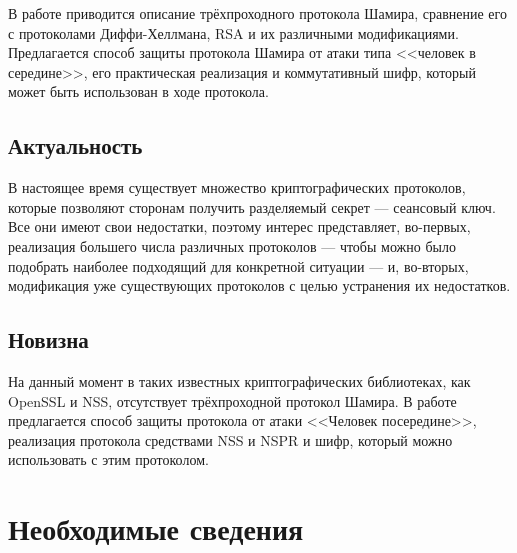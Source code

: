 



\usepackage{csquotes}        %
\usepackage[
]{biblatex}





\Intro

В работе приводится описание трёхпроходного протокола Шамира, сравнение его с протоколами Диффи-Хеллмана, RSA и их различными модификациями. Предлагается способ защиты протокола Шамира от атаки типа <<человек в середине>>, его практическая реализация и коммутативный шифр, который может быть использован в ходе протокола. 
\subsection*{Актуальность}
В настоящее время существует множество криптографических протоколов, которые позволяют сторонам получить разделяемый секрет --- сеансовый ключ. Все они имеют свои недостатки, поэтому интерес представляет, во-первых, реализация большего числа различных протоколов --- чтобы можно было подобрать наиболее подходящий для конкретной ситуации --- и, во-вторых, модификация уже существующих протоколов с целью устранения их недостатков.
\subsection*{Новизна}
На данный момент в таких известных криптографических библиотеках, как OpenSSL и NSS, отсутствует трёхпроходной протокол Шамира. В работе предлагается способ защиты протокола от атаки <<Человек посередине>>, реализация протокола средствами NSS и NSPR и шифр, который можно использовать с этим протоколом.


\section{Необходимые сведения}



